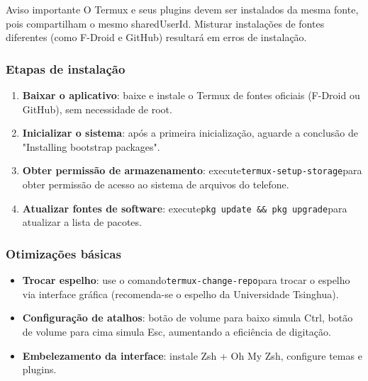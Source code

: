 \begin{tcbwarn}{Aviso importante}
O Termux e seus plugins devem ser instalados da mesma fonte, pois compartilham o mesmo sharedUserId. Misturar instalações de fontes diferentes (como F-Droid e GitHub) resultará em erros de instalação.

\end{tcbwarn}


\subsubsection*{Etapas de instalação}

\begin{enumerate}
  \item \textbf{Baixar o aplicativo}: baixe e instale o Termux de fontes oficiais (F-Droid ou GitHub), sem necessidade de root.
  \item \textbf{Inicializar o sistema}: após a primeira inicialização, aguarde a conclusão de "Installing bootstrap packages".
  \item \textbf{Obter permissão de armazenamento}: execute\texttt{termux-\allowbreak setup-\allowbreak storage}para obter permissão de acesso ao sistema de arquivos do telefone.
  \item \textbf{Atualizar fontes de software}: execute\texttt{pkg update \&\& pkg upgrade}para atualizar a lista de pacotes.
\end{enumerate}

\subsubsection*{Otimizações básicas}

\begin{itemize}
  \item \textbf{Trocar espelho}: use o comando\texttt{termux-\allowbreak change-\allowbreak repo}para trocar o espelho via interface gráfica (recomenda-se o espelho da Universidade Tsinghua).
  \item \textbf{Configuração de atalhos}: botão de volume para baixo simula Ctrl, botão de volume para cima simula Esc, aumentando a eficiência de digitação.
  \item \textbf{Embelezamento da interface}: instale Zsh + Oh My Zsh, configure temas e plugins.
\end{itemize}


